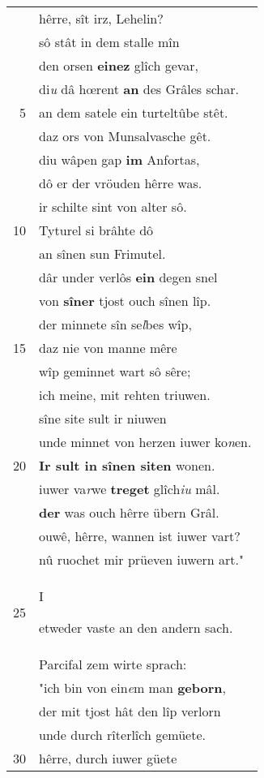 \documentclass[8pt,a4paper,notitlepage]{article}
\begin{document}
\begin{table}[ht]
\begin{minipage}[t]{0.5\linewidth}
\begin{center}
\end{center}
\begin{tabular}{rl}
 & hêrre, sît irz, Lehelin?\\ 
 & sô stât in dem stalle mîn\\ 
 & den orsen \textbf{einez} glîch gevar,\\ 
 & di\textit{u} dâ hœrent \textbf{an} des Grâles schar.\\ 
5 & an dem satele ein turteltûbe stêt.\\ 
 & daz ors von Munsalvasche gêt.\\ 
 & diu wâpen gap \textbf{im} Anfortas,\\ 
 & dô er der vröuden hêrre was.\\ 
 & ir schilte sint von alter sô.\\ 
10 & Tyturel si brâhte dô\\ 
 & an sînen sun Frimutel.\\ 
 & dâr under verlôs \textbf{ein} degen snel\\ 
 & von \textbf{sîner} tjost ouch sînen lîp.\\ 
 & der minnete sîn se\textit{l}bes wîp,\\ 
15 & daz nie von manne mêre\\ 
 & wîp geminnet wart sô sêre;\\ 
 & ich meine, mit rehten triuwen.\\ 
 & sîne site sult ir niuwen\\ 
 & unde minnet von herzen iuwer ko\textit{n}en.\\ 
20 & \textbf{Ir sult in sînen siten} wonen.\\ 
 & iuwer va\textit{r}we \textbf{treget} glîch\textit{iu} mâl.\\ 
 & \textbf{der} was ouch hêrre übern Grâl.\\ 
 & ouwê, hêrre, wannen ist iuwer vart?\\ 
 & nû ruochet mir prüeven iuwern art."\\ 
25 & \begin{large}I\end{large}etweder vaste an den andern sach.\\ 
 & Parcifal zem wirte sprach:\\ 
 & "ich bin von ein\textit{e}m man \textbf{geborn},\\ 
 & der mit tjost hât den lîp verlorn\\ 
 & unde durch rîterlîch gemüete.\\ 
30 & hêrre, durch iuwer güete\\ 

\end{tabular}
\end{minipage}
\end{table}
\end{document}
